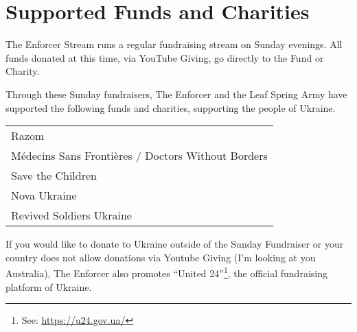 \section{Supported Funds and Charities}
The Enforcer Stream runs a regular fundraising stream on Sunday evenings.
All funds donated at this time, via YouTube Giving, go directly to the 
Fund or Charity.

Through these Sunday fundraisers, The Enforcer and the Leaf Spring Army
have supported the following funds and charities, supporting the people of Ukraine.

\vspace{2mm}
\begin{tabular}{l}
Razom \\
Médecins Sans Frontières / Doctors Without Borders \\
Save the Children \\
Nova Ukraine \\
Revived Soldiers Ukraine \\
\end{tabular}

\vspace{2mm}
If you would like to donate to Ukraine outside of the Sunday Fundraiser or your
country does not allow donations via Youtube Giving (I'm looking at you
Australia), The Enforcer also promotes ``United 24''\footnote{See: \url{https://u24.gov.ua/}},
the official fundraising platform of Ukraine.
